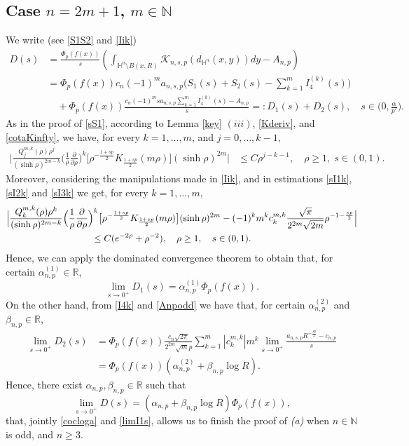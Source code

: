 \documentclass[a4paper,10pt, reqno]{amsart}
\theoremstyle{definition}
\theoremstyle{remark}
\numberwithin{equation}{section}
\begin{document}
{\subsection{Case $n=2m+1$, $m\in \mathbb N$}\label{Dodd} We write (see \eqref{S1S2} and \eqref{Iik})
\begin{align}\label{D}
    D(s)&=\frac{\Phi _p(f(x))}{s}\left(\int_{\mathbb H^n\setminus B(x,R)}\mathcal K_{n,s,p}(d_{\mathbb H^n}(x,y))dy-A_{n,p}\right)\\
    &=\Phi _p(f(x))c_n(-1)^ma_{n,s,p}\Big(S_1(s)+S_2(s)-\sum_{k=1}^mI_4^{(k)}(s)\Big)\nonumber\\
    &\quad +\Phi_p(f(x))\frac{c_n(-1)^msa_{n,s,p}\sum_{k=1}^mI_4^{(k)}(s)-A_{n,p}}{s}=:D_1(s)+D_2(s),\quad s\in \big(0,\tfrac{\alpha}{p'}\big).\nonumber
\end{align}
As in the proof of \eqref{sS1}, according to Lemma \ref{key} $(iii)$, \eqref{Kderiv}, and \eqref{cotaKinfty}, we have, for every $k=1,\ldots, m$, and $j=0,\ldots, k-1$, 
\begin{align*}
\Big| \frac{Q_j^{m,k}(\rho )\rho ^j}{(\sinh \rho )^{2m-k}}\Big(\frac{1}{\rho }\frac{\partial }{\partial \rho }\Big)^k\big[\rho ^{-\frac{1+sp}{2}}K_{\frac{1+sp}{2}}(m\rho )\big](\sinh \rho )^{2m}\Big|&\leq C\rho ^{j-k-1},\quad \rho \geq 1,\;s\in (0,1).
\end{align*}
Moreover, considering the manipulations made in \eqref{Iik}, and in estimations \eqref{sI1k}, \eqref{sI2k} and \eqref{sI3k} we get, for every $k=1,\ldots, m$, 
\begin{align*}
    \Big|\frac{Q_k^{m,k}(\rho )\rho ^k}{(\sinh \rho )^{2m-k}}\Big(\frac{1}{\rho }\frac{\partial }{\partial \rho }\Big)^k\big[\rho ^{-\frac{1+sp}{2}}K_{\frac{1+sp}{2}}(m\rho )\big](\sinh \rho )^{2m}-(-1)^km^kc_k^{m,k}\frac{\sqrt{\pi}}{2^{2m}\sqrt{2m}}\rho ^{-1-\frac{sp}{2}}\Big|&\\
    &\hspace{-10cm}\leq C(e^{-2\rho}+\rho ^{-2}),\quad \rho \geq 1,\quad s\in (0,1).
\end{align*}
Hence, we can apply the dominated convergence theorem to obtain that, for certain $\alpha_{n,p}^{(1)}\in \mathbb R$,
$$
\lim_{s\rightarrow 0^+}D_1(s)=\alpha_{n,p}^{(1)}\Phi _p(f(x)).
$$
On the other hand, from \eqref{I4k} and \eqref{Anpodd} we have that, for certain $\alpha_{n,p}^{(2)}$ and $\beta_{n,p}\in \mathbb R$,
\begin{align*}
\lim_{s\rightarrow 0^+}D_2(s)&=\Phi_p(f(x))\frac{c_n\sqrt{2\pi}}{2^{2m}\sqrt{m}p}\sum_{k=1}^m|c_k^{m,k}|m^k\lim_{s\rightarrow 0^+}\frac{a_{n,s,p}R^{-\frac{sp}{2}}-c_{n,p}}{s}\nonumber\\
&=\Phi_p(f(x))(\alpha_{n,p}^{(2)}+\beta_{n,p}\log R).
\end{align*}
Hence, there exist $\alpha_{n,p},\beta_{n,p}\in \mathbb R$ such that
$$
\lim_{s\rightarrow 0^+}D(s)=(\alpha_{n,p}+\beta_{n,p}\log R)\Phi_p(f(x)),
$$
that, jointly \eqref{cocloga} and \eqref{limI1s}, allows us to finish the proof of {\it (a)} when $n\in \mathbb N$ is odd, and $n\geq 3$.   

}
\end{document}
